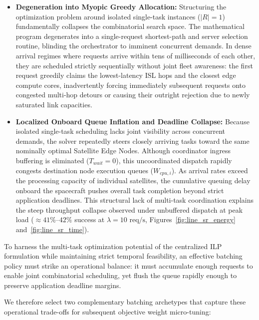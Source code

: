 \begin{itemize}
    \item \textbf{Degeneration into Myopic Greedy Allocation:} Structuring the optimization problem around isolated single-task instances ($|R| = 1$) fundamentally collapses the combinatorial search space. The mathematical program degenerates into a single-request shortest-path and server selection routine, blinding the orchestrator to imminent concurrent demands. In dense arrival regimes where requests arrive within tens of milliseconds of each other, they are scheduled strictly sequentially without joint fleet awareness: the first request greedily claims the lowest-latency ISL hops and the closest edge compute cores, inadvertently forcing immediately subsequent requests onto congested multi-hop detours or causing their outright rejection due to newly saturated link capacities.
    
    \item \textbf{Localized Onboard Queue Inflation and Deadline Collapse:} Because isolated single-task scheduling lacks joint visibility across concurrent demands, the solver repeatedly steers closely arriving tasks toward the same nominally optimal Satellite Edge Nodes. Although coordinator ingress buffering is eliminated ($T_{wait} = 0$), this uncoordinated dispatch rapidly congests destination node execution queues ($W_{cpu,i}$). As arrival rates exceed the processing capacity of individual satellites, the cumulative queuing delay onboard the spacecraft pushes overall task completion beyond strict application deadlines. This structural lack of multi-task coordination explains the steep throughput collapse observed under unbuffered dispatch at peak load ($\approx 41\%$--$42\%$ success at $\lambda = 10\text{ req/s}$, Figures~\ref{fig:line_sr_energy} and~\ref{fig:line_sr_time}).
\end{itemize}

To harness the multi-task optimization potential of the centralized ILP formulation while maintaining strict temporal feasibility, an effective batching policy must strike an operational balance: it must accumulate enough requests to enable joint combinatorial scheduling, yet flush the queue rapidly enough to preserve application deadline margins.

We therefore select two complementary batching archetypes that capture these operational trade-offs for subsequent objective weight micro-tuning:

